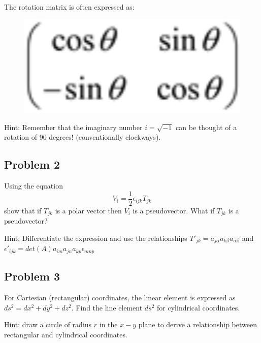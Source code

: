 \documentclass{article}
\begin{document}
 The rotation matrix is often expressed as:
 \begin{figure}[h]
     \centering
     \includegraphics[scale=0.15]{trans}
 \end{figure}
 
 Hint: Remember that the imaginary number $i=\sqrt{-1}$ can be thought of a rotation of 90 degrees! (conventionally clockways).
  \subsection{Problem 2}
Using the equation
\begin{equation}
    V_i=\frac{1}{2}\epsilon_{ijk}T_{jk}
\end{equation}show that if $T_{jk}$ is a polar vector then $V_i$ is a pseudovector. What if $T_{jk}$ is a pseudovector?

Hint: Differentiate the expression and use the relationships $T'_{jk}=a_{j\alpha}a_{k\beta}a_{\alpha \beta}$ and $\epsilon'_{ijk}=det(A)a_{im}a_{jn}a_{kp}\epsilon_{mnp}$
  \subsection{Problem 3}
For Cartesian (rectangular) coordinates, the linear element is expressed as $ds^2=dx^2+dy^2+dz^2$. Find the line element $ds^2$ for cylindrical coordinates.

Hint: draw a circle of radius $r$ in the $x-y$ plane to derive a relationship between rectangular and cylindrical coordinates.
\end{document}
